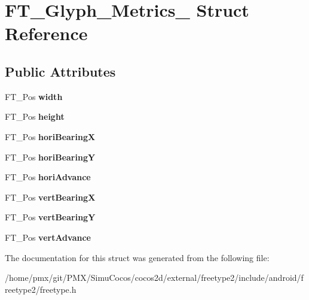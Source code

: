 \hypertarget{structFT__Glyph__Metrics__}{}\section{F\+T\+\_\+\+Glyph\+\_\+\+Metrics\+\_\+ Struct Reference}
\label{structFT__Glyph__Metrics__}
\subsection*{Public Attributes}
\begin{DoxyCompactItemize}
\item 
\mbox{\label{structFT__Glyph__Metrics___a0ff1be869e6a28d1f2990b0e5719dca9}} 
F\+T\+\_\+\+Pos {\bfseries width}
\item 
\mbox{\label{structFT__Glyph__Metrics___aa2a76ec448ec9d18acf343f01b77cb21}} 
F\+T\+\_\+\+Pos {\bfseries height}
\item 
\mbox{\label{structFT__Glyph__Metrics___a2afc877f52c8a8910ec144a1948186cc}} 
F\+T\+\_\+\+Pos {\bfseries hori\+BearingX}
\item 
\mbox{\label{structFT__Glyph__Metrics___afd97c10d43ed1f66598a18884468b536}} 
F\+T\+\_\+\+Pos {\bfseries hori\+BearingY}
\item 
\mbox{\label{structFT__Glyph__Metrics___af12db260a90b8a7c938ad48ebf20ccbe}} 
F\+T\+\_\+\+Pos {\bfseries hori\+Advance}
\item 
\mbox{\label{structFT__Glyph__Metrics___aead5c5637b983b811738bff3bcea8cea}} 
F\+T\+\_\+\+Pos {\bfseries vert\+BearingX}
\item 
\mbox{\label{structFT__Glyph__Metrics___a7f1aba91b86fddeb11030eab15dcce08}} 
F\+T\+\_\+\+Pos {\bfseries vert\+BearingY}
\item 
\mbox{\label{structFT__Glyph__Metrics___a594f43c64fe5c12a399a0f0a47c04990}} 
F\+T\+\_\+\+Pos {\bfseries vert\+Advance}
\end{DoxyCompactItemize}


The documentation for this struct was generated from the following file\+:\begin{DoxyCompactItemize}
\item 
/home/pmx/git/\+P\+M\+X/\+Simu\+Cocos/cocos2d/external/freetype2/include/android/freetype2/freetype.\+h\end{DoxyCompactItemize}
